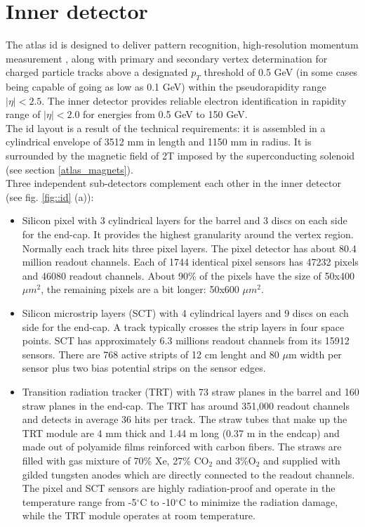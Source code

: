         \section{Inner detector}
		The \gls{atlas} \gls{id} is designed to deliver pattern recognition, high-resolution momentum measurement \cite{id_tdr1},\cite{id_tdr2} along with primary and secondary vertex determination for charged particle tracks above a designated $p_T$ threshold of 0.5 GeV (in some cases being capable of going as low as 0.1 GeV) within the pseudorapidity range $|\eta| < 2.5$. The inner detector provides reliable electron identification in rapidity range of $|\eta| < 2.0$ for energies from 0.5 GeV to 150 GeV.\\
		The  \gls{id} layout is a result of the technical requirements: it is assembled in a cylindrical envelope of 3512 mm in length and 1150 mm in radius. It is surrounded by the magnetic field of 2T imposed by the superconducting solenoid (see section \ref{atlas_magnets}).\\
		Three independent sub-detectors complement each other in the inner detector (see fig. \ref{fig::id} (a)):
		\begin{itemize}
		\item Silicon pixel with 3 cylindrical layers for the barrel and 3 discs on each side for the end-cap. It provides the highest granularity around the vertex region. Normally each track hits three pixel layers. The pixel detector has about 80.4 million readout channels. Each of 1744 identical pixel sensors has 47232 pixels and 46080 readout channels. About 90\% of the pixels have the size of 50x400 $\mu m^2$, the remaining pixels are a bit longer: 50x600 $\mu m^2$.
		\item Silicon microstrip layers (SCT) with 4 cylindrical layers and 9 discs on each side for the end-cap. A track typically crosses the strip layers in four space points. SCT has approximately 6.3 millions readout channels from its 15912 sensors. There are 768 active stripts of 12 cm lenght and 80 $\mu$m width per sensor plus two bias potential strips on the sensor edges.
		\item Transition radiation tracker (TRT) with 73 straw planes in the barrel and 160 straw planes in the end-cap. The TRT has around 351,000 readout channels and detects in average 36 hits per track. The straw tubes that make up the TRT module are 4 mm thick and 1.44 m long (0.37 m in the endcap) and made out of polyamide films reinforced with carbon fibers. The straws are filled with gas mixture of 70\% Xe, 27\% CO$_2$ and 3\%O$_2$ and supplied with gilded tungsten anodes which are directly connected to the readout channels.
		The pixel and SCT sensors are highly radiation-proof and operate in the temperature range from -5$^\circ$C to -10$^\circ$C to minimize the radiation damage, while the TRT module operates at room temperature.	
		\end{itemize}
